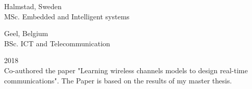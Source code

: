\documentclass[a4paper,12pt,final]{memoir}
\begin{document}
 \hfill Halmstad, Sweden \\
MSc. Embedded and Intelligent systems
\SmallSep

 \hfill Geel, Belgium \\
BSc. ICT and Telecommunication
\Sep

 \hfill 2018 \\
Co-authored the paper "Learning wireless channels models to design real-time communications". The Paper is based on the results of my master thesis. 
\Sep


\end{document}
